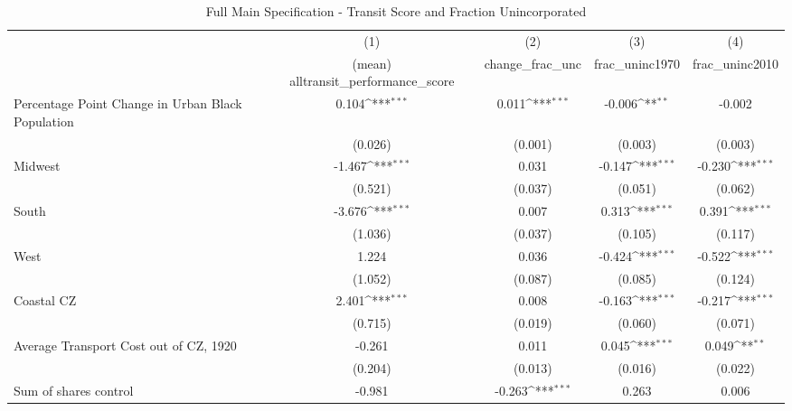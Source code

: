 \begin{table}[htbp]\centering
\def\sym#1{\ifmmode^{#1}\else\(^{#1}\)\fi}
\caption{Full Main Specification - Transit Score and Fraction Unincorporated}
\begin{tabular}{l*{4}{c}}
\hline\hline
                    &\multicolumn{1}{c}{(1)}&\multicolumn{1}{c}{(2)}&\multicolumn{1}{c}{(3)}&\multicolumn{1}{c}{(4)}\\
                    &\multicolumn{1}{c}{(mean) alltransit\_performance\_score}&\multicolumn{1}{c}{change\_frac\_unc}&\multicolumn{1}{c}{frac\_uninc1970}&\multicolumn{1}{c}{frac\_uninc2010}\\
\hline
Percentage Point Change in Urban Black Population&       0.104\sym{***}&       0.011\sym{***}&      -0.006\sym{**} &      -0.002         \\
                    &     (0.026)         &     (0.001)         &     (0.003)         &     (0.003)         \\
[1em]
Midwest             &      -1.467\sym{***}&       0.031         &      -0.147\sym{***}&      -0.230\sym{***}\\
                    &     (0.521)         &     (0.037)         &     (0.051)         &     (0.062)         \\
[1em]
South               &      -3.676\sym{***}&       0.007         &       0.313\sym{***}&       0.391\sym{***}\\
                    &     (1.036)         &     (0.037)         &     (0.105)         &     (0.117)         \\
[1em]
West                &       1.224         &       0.036         &      -0.424\sym{***}&      -0.522\sym{***}\\
                    &     (1.052)         &     (0.087)         &     (0.085)         &     (0.124)         \\
[1em]
Coastal CZ          &       2.401\sym{***}&       0.008         &      -0.163\sym{***}&      -0.217\sym{***}\\
                    &     (0.715)         &     (0.019)         &     (0.060)         &     (0.071)         \\
[1em]
Average Transport Cost out of CZ, 1920&      -0.261         &       0.011         &       0.045\sym{***}&       0.049\sym{**} \\
                    &     (0.204)         &     (0.013)         &     (0.016)         &     (0.022)         \\
[1em]
Sum of shares control&      -0.981         &      -0.263\sym{***}&       0.263         &       0.006         \\

\end{tabular}
\end{table}
